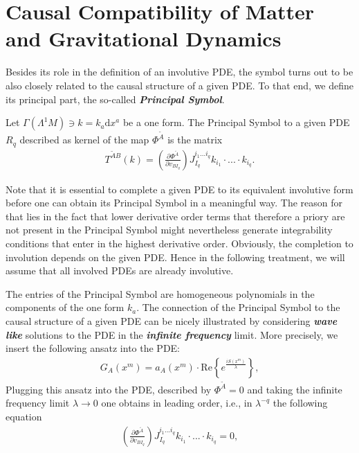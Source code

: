 \section{Causal Compatibility of Matter and Gravitational Dynamics}
Besides its role in the definition of an involutive PDE, the symbol turns out to be also closely related to the causal structure of a given PDE. To that end, we define its principal part, the so-called \textbf{\textit{Principal Symbol}}.
\begin{definition} \label{PSym}
Let $\Gamma(\Lambda^1M) \ni k = k_{a} \mathrm{d}x^a$ be a one form. The Principal Symbol to a given PDE $R_q$ described as kernel of the map $\Phi^{\tilde{A}}$ is the matrix
\begin{align}
    T^{\tilde{A} B}(k) = \left ( \frac{\partial \Phi^{\tilde{A}}}{\partial v_{BI_q}} \right ) J_{I_q}^{i_1...i_q} k_{i_1} \cdot ... \cdot k_{i_q}.
\end{align}
\end{definition}
\begin{remark}
Note that it is essential to complete a given PDE to its equivalent involutive form before one can obtain its Principal Symbol in a meaningful way. The reason for that lies in the fact that lower derivative order terms that therefore a priory are not present in the Principal Symbol might nevertheless generate integrability conditions that enter in the highest derivative order. Obviously, the completion to involution depends on the given PDE. Hence in the following treatment, we will assume that all involved PDEs are already involutive.
\end{remark}
The entries of the Principal Symbol are homogeneous polynomials in the components of the one form $k_a$.
The connection of the Principal Symbol to the causal structure of a given PDE can be nicely illustrated by considering \textit{\textbf{wave like}} solutions to the PDE in the \textit{\textbf{infinite frequency}} limit. 
More precisely, we insert the following ansatz into the PDE:
\begin{align}\label{waveAns}
    G_A(x^m) = a_A(x^m) \cdot \mathrm{Re}\left \{ e^{\frac{iS(x^m)}{\lambda}} \right \},
\end{align}
Plugging this ansatz into the PDE, described by $\Phi^{\tilde{A}}=0$ and taking the infinite frequency limit $\lambda \rightarrow 0$ one obtains in leading order, i.e., in $\lambda^{-q}$ the following equation
\begin{align}
    \left ( \frac{\partial \Phi^{\tilde{A}}}{\partial v_{BI_q}} \right ) J_{I_q}^{i_1...i_q} k_{i_1} \cdot ... \cdot k_{i_q} = 0,
\end{align}
